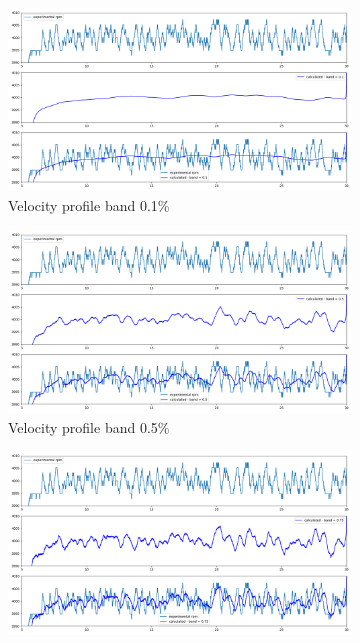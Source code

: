 \documentclass[10pt,fleqn,a4paper,twoside]{article}
\begin{document}
    \begin{figure}
        \centering
        \begin{subfigure}{0.4\textwidth}
            \includegraphics[width=\textwidth]{Figures/rpm_analysis_mic4_band_0.1.png}
            \caption{Velocity profile band 0.1\%}
            \label{fig:first}
        \end{subfigure}
        \hfill
        \centering
        \begin{subfigure}{0.4\textwidth}
            \includegraphics[width=\textwidth]{Figures/rpm_analysis_mic4_band_0.5.png}
            \caption{Velocity profile band 0.5\%}
            \label{fig:second}
        \end{subfigure}
        \hfill
        \centering
        \begin{subfigure}{0.4\textwidth}
            \includegraphics[width=\textwidth]{Figures/rpm_analysis_mic4_band_0.75.png}

\end{subfigure}
\end{figure}
\end{document}
